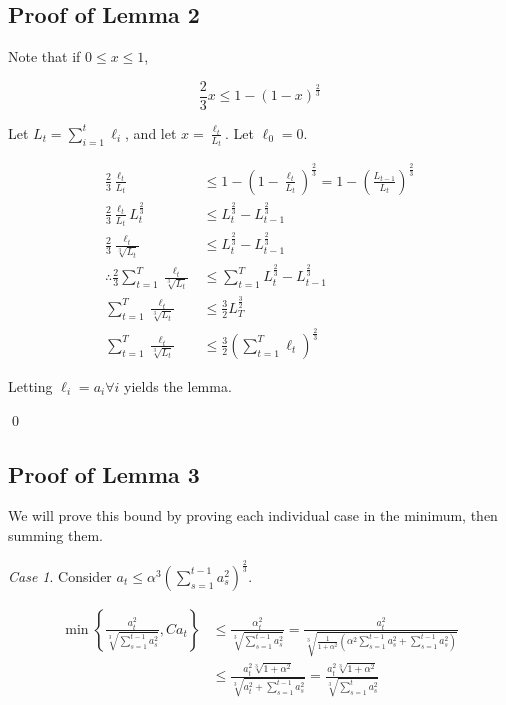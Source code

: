 \documentclass{article}
\begin{document}
\subsection{Proof of Lemma 2}\label{lemmaproof:2}

\firstbound*

\proof Note that if $0 \leq x \leq 1$, 

\[
  \frac{2}{3} x \leq 1 - (1 - x)^\frac{2}{3}
\]

Let $L_t = \sum\limits_{i=1}^t \ell_i$, and let $x = \frac{\ell_t}{L_t}$. Let $\ell_0 = 0$.

\begin{align*}
  \frac{2}{3} \frac{\ell_t}{L_t}
  &\leq 1 - (1 - \frac{\ell_t}{L_t})^\frac{2}{3} = 1 - (\frac{L_{t-1}}{L_t})^\frac{2}{3} \\
  \frac{2}{3} \frac{\ell_t}{L_t} L_{t}^\frac{2}{3} &\leq L_{t}^\frac{2}{3} - L_{t-1}^\frac{2}{3} \\
  \frac{2}{3} \frac{\ell_t}{\sqrt[3]{L_t}} &\leq L_{t}^\frac{2}{3} - L_{t-1}^\frac{2}{3} \\
  \therefore \frac{2}{3} \sum\limits_{t=1}^T \frac{\ell_t}{\sqrt[3]{L_t}} &\leq \sum\limits_{t=1}^T L_{t}^\frac{2}{3} -
  L_{t-1}^\frac{2}{3} \\
  \sum\limits_{t=1}^T \frac{\ell_t}{\sqrt[3]{L_t}} &\leq \frac{3}{2} L_{T}^\frac{3}{2} \\
  \sum\limits_{t=1}^T \frac{\ell_t}{\sqrt[3]{L_t}} &\leq \frac{3}{2} \left(\sum\limits_{t=1}^T \ell_t \right)^\frac{2}{3}
\end{align*}

Letting $\ell_i = a_i \forall i$ yields the lemma.

\qed

\subsection{Proof of Lemma 3}\label{lemmaproof:3}

\secondbound*

\proof We will prove this bound by proving each individual case in the minimum, then summing them.

\emph{Case 1}. Consider $a_t \leq \alpha^3 \left(\sum\limits_{s=1}^{t-1} a_s^2\right)^\frac{2}{3}$.

\begin{align*}
  \min \left\{ \frac{a_{t}^2}{\sqrt[3]{\sum\limits_{s=1}^{t-1} a_{s}^2}}, C a_t \right\} 
  &\leq \frac{\alpha_{t}^2}{\sqrt[3]{\sum\limits_{s=1}^{t-1}a_{s}^2}} =
  \frac{a_{t}^2}{\sqrt[3]{\frac{1}{1+\alpha^2}\left(\alpha^2 \sum\limits_{s=1}^{t-1} a_{s}^2 +
  \sum\limits_{s=1}^{t-1} a_{s}^2 \right)}} \\
  &\leq \frac{a_{t}^2 \sqrt[3]{1 + \alpha^2}}{\sqrt[3]{a_{t}^2 + \sum\limits_{s=1}^{t-1} a_{s}^2}} = \frac{a_{t}^2
  \sqrt[3]{1 + \alpha^2}}{\sqrt[3]{\sum\limits_{s=1}^t a_{s}^2}}
\end{align*}
\end{document}
